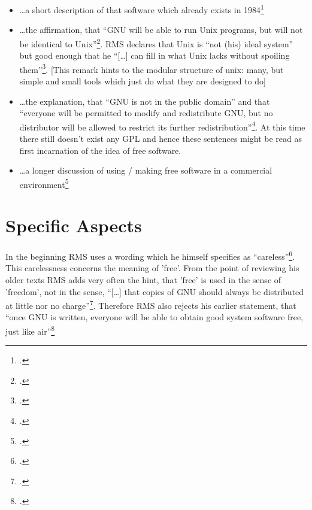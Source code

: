 \documentclass[DIV=calc,BCOR=5mm,11pt,headings=small,oneside,abstract=true, toc=bib]{scrartcl}
\begin{document}
\begin{itemize}
  \item \ldots a short description of that software which already exists in
  1984\footcite[cf.][31]{Stallman1984a}
  \item \ldots the affirmation, that \enquote{GNU will be able to run Unix
  programs, but will not be identical to
  Unix}\footcite[cf.][31]{Stallman1984a}. RMS declares that Unix is
  \enquote{not (his) ideal system} but good enough that he \enquote{[\ldots]
  can fill in what Unix lacks without spoiling
  them}\footcite[cf.][32]{Stallman1984a}. [This remark hints to the
  modular structure of unix: many, but simple and small tools which just do what
  they are designed to do]
  \item \ldots the explanation, that \enquote{GNU is not in the public
  domain} and that \enquote{everyone will be permitted to modify and
  redistribute GNU, but no distributor will be allowed to restrict its
  further redistribution}\footcite[cf.][32]{Stallman1984a}. At this time
  there still doesn't exist any GPL and hence these sentences might be read as
  first incarnation of the idea of free software.
  \item \ldots a longer discussion of using / making free software in a
  commercial environment\footcite[cf.][34ff]{Stallman1984a}
\end{itemize}

\section{Specific Aspects}

In the beginning RMS uses a wording which he himself specifies as
\enquote{careless}\footcite[cf.][31, FN 1]{Stallman1984a}. This carelessness
concerns the meaning of 'free'. From the point of reviewing his older texts RMS
adds very often the hint, that 'free' is used in the sense of 'freedom', not in
the sense, \enquote{[\ldots] that copies of GNU should always be
distributed at little nor no charge}\footcite[cf.][31, FN
1]{Stallman1984a}. Therefore RMS also rejects his earlier statement, that
\enquote{once GNU is written, everyone will be able to obtain good system
software free, just like air}\footcite[cf.][34]{Stallman1984a}
\small

\end{document}
